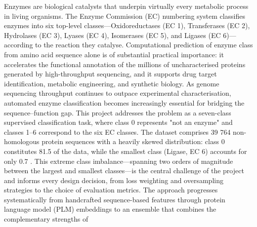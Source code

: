 \markdownRendererDocumentBegin
\markdownRendererSectionBegin
{}\markdownRendererInterblockSeparator
{}\markdownRendererSectionBegin
{}\markdownRendererInterblockSeparator
{}Enzymes are biological catalysts that underpin virtually every metabolic process in living\markdownRendererSoftLineBreak
{}organisms. The Enzyme Commission (EC) numbering system classifies enzymes into six top-level\markdownRendererSoftLineBreak
{}classes—Oxidoreductases (EC 1), Transferases (EC 2), Hydrolases (EC 3), Lyases (EC 4),\markdownRendererSoftLineBreak
{}Isomerases (EC 5), and Ligases (EC 6)—according to the reaction they catalyse. Computational\markdownRendererSoftLineBreak
{}prediction of enzyme class from amino acid sequence alone is of substantial practical\markdownRendererSoftLineBreak
{}importance: it accelerates the functional annotation of the millions of uncharacterised\markdownRendererSoftLineBreak
{}proteins generated by high-throughput sequencing, and it supports drug target identification,\markdownRendererSoftLineBreak
{}metabolic engineering, and synthetic biology. As genome sequencing throughput continues to\markdownRendererSoftLineBreak
{}outpace experimental characterisation, automated enzyme classification becomes increasingly\markdownRendererSoftLineBreak
{}essential for bridging the sequence–function gap.\markdownRendererParagraphSeparator
{}This project addresses the problem as a seven-class supervised classification task, where\markdownRendererSoftLineBreak
{}class 0 represents "not an enzyme" and classes 1–6 correspond to the six EC classes. The\markdownRendererSoftLineBreak
{}dataset comprises 39 764 non-homologous protein sequences with a heavily skewed distribution:\markdownRendererSoftLineBreak
{}class 0 constitutes 81.5 \markdownRendererPercentSign{} of the data, while the smallest class (Ligase, EC 6) accounts\markdownRendererSoftLineBreak
{}for only 0.7 \markdownRendererPercentSign{}. This extreme class imbalance—spanning two orders of magnitude between the\markdownRendererSoftLineBreak
{}largest and smallest classes—is the central challenge of the project and informs every design\markdownRendererSoftLineBreak
{}decision, from loss weighting and oversampling strategies to the choice of evaluation metrics.\markdownRendererParagraphSeparator
{}The approach progresses systematically from handcrafted sequence-based features through protein\markdownRendererSoftLineBreak
{}language model (PLM) embeddings to an ensemble that combines the complementary strengths of\markdownRendererSoftLineBreak
